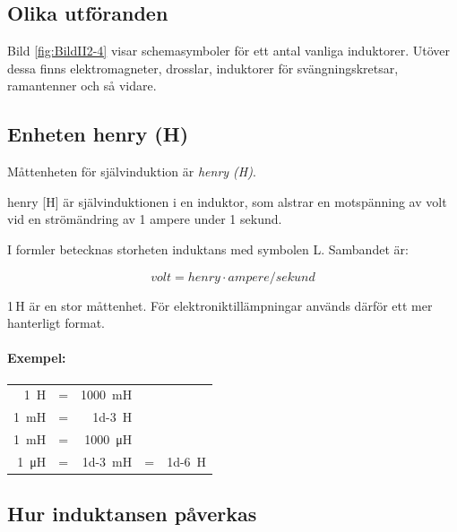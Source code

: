 \subsection{Olika utföranden}

Bild \ref{fig:BildII2-4} visar schemasymboler för ett antal vanliga induktorer.
Utöver dessa finns elektromagneter, drosslar, induktorer för svängningskretsar,
ramantenner och så vidare.

\subsection{Enheten henry (H)}

Måttenheten för självinduktion är \emph{henry (H)}.

 henry [H] är självinduktionen i en induktor, som alstrar en
motspänning av
 volt vid en strömändring av 1 ampere under 1 sekund.

I formler betecknas storheten induktans med symbolen L. Sambandet är:

\[ \unit{volt} = \unit{henry} \cdot \unit{ampere}/\unit{sekund} \]

1\,H är en stor måttenhet. För elektroniktillämpningar används därför
ett mer hanterligt format.

\noindent \paragraph{Exempel:}

\begin{tabular}{rcrcr}
	      \SI{1}{\henry} & = & \SI{1000}{\milli\henry} &   &  \\
	\SI{1}{\milli\henry} & = &       \SI{1d-3}{\henry} &   &  \\
	\SI{1}{\milli\henry} & = & \SI{1000}{\micro\henry} &   &  \\
	\SI{1}{\micro\henry} & = & \SI{1d-3}{\milli\henry} & = & \SI{1d-6}{\henry}
\end{tabular}

\subsection{Hur induktansen påverkas}

